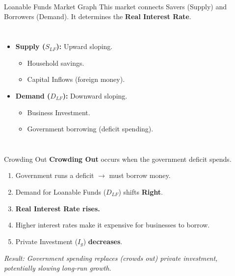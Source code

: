 \documentclass[aspectratio=169]{beamer}
\begin{document}
\begin{frame}{Loanable Funds Market Graph}
    This market connects Savers (Supply) and Borrowers (Demand). It determines the \textbf{Real Interest Rate}.

    \begin{columns}
        \begin{itemize}
            \item \textbf{Supply ($S_{LF}$):} Upward sloping.
            \begin{itemize}
                \item Household savings.
                \item Capital Inflows (foreign money).
            \end{itemize}
            \item \textbf{Demand ($D_{LF}$):} Downward sloping.
            \begin{itemize}
                \item Business Investment.
                \item Government borrowing (deficit spending).
            \end{itemize}
        \end{itemize}

    \end{columns}
\end{frame}

\begin{frame}{Crowding Out}
    \textbf{Crowding Out} occurs when the government deficit spends.
    
    \vspace{0.3cm}
    \begin{enumerate}
        \item Government runs a deficit $\rightarrow$ must borrow money.
        \item Demand for Loanable Funds ($D_{LF}$) shifts \textbf{Right}.
        \item \textbf{Real Interest Rate rises.}
        \item Higher interest rates make it expensive for businesses to borrow.
        \item Private Investment ($I_g$) \textbf{decreases}.
    \end{enumerate}
    
    \vspace{0.3cm}
    \textit{Result: Government spending replaces (crowds out) private investment, potentially slowing long-run growth.}
\end{frame}
\end{document}

